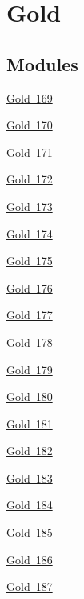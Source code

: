 \hypertarget{group___isotope_const-_gold}{}\section{Gold}
\label{group___isotope_const-_gold}
\subsection*{Modules}
\begin{DoxyCompactItemize}
\item 
\mbox{\hyperlink{group___isotope_const-_gold-_au169}{Gold 169}}
\item 
\mbox{\hyperlink{group___isotope_const-_gold-_au170}{Gold 170}}
\item 
\mbox{\hyperlink{group___isotope_const-_gold-_au171}{Gold 171}}
\item 
\mbox{\hyperlink{group___isotope_const-_gold-_au172}{Gold 172}}
\item 
\mbox{\hyperlink{group___isotope_const-_gold-_au173}{Gold 173}}
\item 
\mbox{\hyperlink{group___isotope_const-_gold-_au174}{Gold 174}}
\item 
\mbox{\hyperlink{group___isotope_const-_gold-_au175}{Gold 175}}
\item 
\mbox{\hyperlink{group___isotope_const-_gold-_au176}{Gold 176}}
\item 
\mbox{\hyperlink{group___isotope_const-_gold-_au177}{Gold 177}}
\item 
\mbox{\hyperlink{group___isotope_const-_gold-_au178}{Gold 178}}
\item 
\mbox{\hyperlink{group___isotope_const-_gold-_au179}{Gold 179}}
\item 
\mbox{\hyperlink{group___isotope_const-_gold-_au180}{Gold 180}}
\item 
\mbox{\hyperlink{group___isotope_const-_gold-_au181}{Gold 181}}
\item 
\mbox{\hyperlink{group___isotope_const-_gold-_au182}{Gold 182}}
\item 
\mbox{\hyperlink{group___isotope_const-_gold-_au183}{Gold 183}}
\item 
\mbox{\hyperlink{group___isotope_const-_gold-_au184}{Gold 184}}
\item 
\mbox{\hyperlink{group___isotope_const-_gold-_au185}{Gold 185}}
\item 
\mbox{\hyperlink{group___isotope_const-_gold-_au186}{Gold 186}}
\item 
\mbox{\hyperlink{group___isotope_const-_gold-_au187}{Gold 187}}

\end{DoxyCompactItemize}
